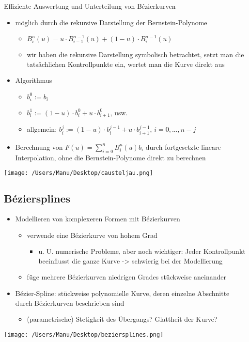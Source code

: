 \documentclass[paper=a4, fontsize=11pt]{scrartcl} %
\numberwithin{equation}{section} %
\numberwithin{figure}{section} %
\numberwithin{table}{section} %
\begin{document}
Effiziente Auswertung und Unterteilung von Bézierkurven
\begin{itemize}
\item möglich durch die rekursive Darstellung der Bernstein-Polynome
\begin{itemize}
\item $B^n_i(u) = u \cdot B^{n-1}_{i-1}(u) + (1-u) \cdot B^{n-1}_i(u)$
\item wir haben die rekursive Darstellung symbolisch betrachtet, setzt man die tatsächlichen Kontrollpunkte ein, wertet man die Kurve direkt aus
\end{itemize}
\item Algorithmus
\begin{itemize}
\item $b^0_i := b_i$
\item $b^1_i := (1-u) \cdot b^0_i + u \cdot b^0_{i+1}$, usw.
\item allgemein: $b^j_i := (1-u) \cdot b^{j-1}_i + u \cdot b^{j-1}_{i+1}$, $i = 0,...,n-j$
\end{itemize}
\item Berechnung von $F(u) = \sum^n_{i=0}B^n_i(u)b_i$ durch fortgesetzte lineare Interpolation, ohne die Bernstein-Polynome direkt zu berechnen
\end{itemize}

\texttt{[image: /Users/Manu/Desktop/causteljau.png]}

\subsection{Béziersplines}

\begin{itemize}
\item Modellieren von komplexeren Formen mit Bézierkurven
\begin{itemize}
\item verwende eine Bézierkurve von hohem Grad
\begin{itemize}
\item u. U. numerische Probleme, aber noch wichtiger: Jeder Kontrollpunkt beeinflusst die ganze Kurve -> schwierig bei der Modellierung
\end{itemize}
\item füge mehrere Bézierkurven niedrigen Grades stückweise aneinander
\end{itemize}
\item Bézier-Spline: stückweise polynomielle Kurve, deren einzelne Abschnitte durch Bézierkurven beschrieben sind
\begin{itemize}
\item (parametrische) Stetigkeit des Übergangs? Glattheit der Kurve?
\end{itemize}
\end{itemize}

\texttt{[image: /Users/Manu/Desktop/beziersplines.png]}
\end{document}
